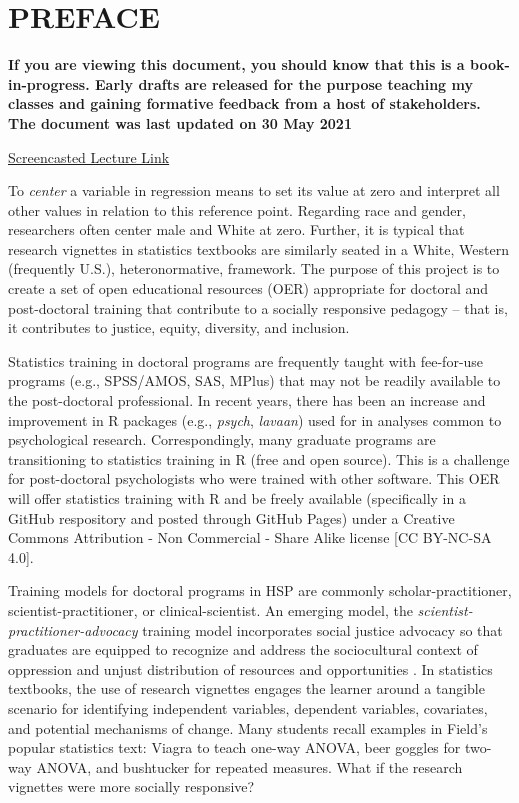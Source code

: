 \documentclass[
  english,
]{book}
\begin{document}
\hypertarget{preface}{%
\chapter*{PREFACE}\label{preface}}

\textbf{If you are viewing this document, you should know that this is a book-in-progress. Early drafts are released for the purpose teaching my classes and gaining formative feedback from a host of stakeholders. The document was last updated on 30 May 2021}

\href{https://spu.hosted.panopto.com/Panopto/Pages/Viewer.aspx?id=c932455e-ef06-444a-bdca-acf7012d759a}{Screencasted Lecture Link}

To \emph{center} a variable in regression means to set its value at zero and interpret all other values in relation to this reference point. Regarding race and gender, researchers often center male and White at zero. Further, it is typical that research vignettes in statistics textbooks are similarly seated in a White, Western (frequently U.S.), heteronormative, framework. The purpose of this project is to create a set of open educational resources (OER) appropriate for doctoral and post-doctoral training that contribute to a socially responsive pedagogy -- that is, it contributes to justice, equity, diversity, and inclusion.

Statistics training in doctoral programs are frequently taught with fee-for-use programs (e.g., SPSS/AMOS, SAS, MPlus) that may not be readily available to the post-doctoral professional. In recent years, there has been an increase and improvement in R packages (e.g., \emph{psych}, \emph{lavaan}) used for in analyses common to psychological research. Correspondingly, many graduate programs are transitioning to statistics training in R (free and open source). This is a challenge for post-doctoral psychologists who were trained with other software. This OER will offer statistics training with R and be freely available (specifically in a GitHub respository and posted through GitHub Pages) under a Creative Commons Attribution - Non Commercial - Share Alike license {[}CC BY-NC-SA 4.0{]}.

Training models for doctoral programs in HSP are commonly scholar-practitioner, scientist-practitioner, or clinical-scientist. An emerging model, the \emph{scientist-practitioner-advocacy} training model incorporates social justice advocacy so that graduates are equipped to recognize and address the sociocultural context of oppression and unjust distribution of resources and opportunities \citep{mallinckrodt_scientist-practitioner-advocate_2014}. In statistics textbooks, the use of research vignettes engages the learner around a tangible scenario for identifying independent variables, dependent variables, covariates, and potential mechanisms of change. Many students recall examples in Field's \citeyearpar{field_discovering_2012} popular statistics text: Viagra to teach one-way ANOVA, beer goggles for two-way ANOVA, and bushtucker for repeated measures. What if the research vignettes were more socially responsive?
\end{document}
